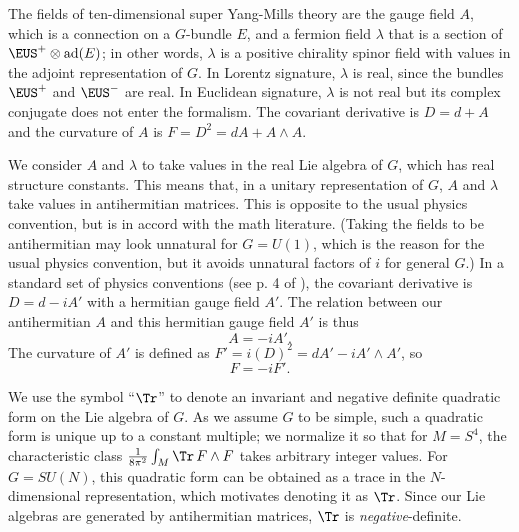 \par{}

The fields of ten-dimensional super Yang-Mills theory are the
gauge field $A$, which is a connection on a $G$-bundle $E$, and a
fermion field $\lambda$ that is a section of ${\EUS}^+\otimes {\rm
ad}(E)$; in other words, $\lambda$ is a positive chirality spinor
field with values in the adjoint representation of $G$. In Lorentz
signature, $\lambda$ is real, since the bundles ${\EUS}^+$ and
${\EUS}^-$ are real.  In Euclidean signature, $\lambda$ is not
real but its complex conjugate does not enter the formalism. The
covariant derivative is $D=d+A$ and the curvature of $A$ is
$F=D^2=dA+A\wedge A$.

We consider $A$ and $\lambda$ to take values in the real Lie
algebra of $G$, which has real structure constants.  This means
that, in a unitary representation of $G$, $A$ and $\lambda$ take
values in antihermitian matrices. This is opposite to the usual
physics convention, but is in accord with the math literature.
(Taking the fields to be antihermitian may look unnatural for
$G=U(1)$, which is the reason for the usual physics convention,
but it avoids unnatural factors of $i$ for general $G$.)  In a
standard set of physics conventions (see p. 4 of \cite{ref44}), the covariant derivative is $D=d-iA'$ with a
hermitian gauge field $A'$.  The relation between our
antihermitian $A$ and this hermitian gauge field $A'$ is thus
\setcounter{equation}{1}
\begin{equation}\label{eq:boloko}
A=-iA'.
\end{equation}
  The curvature of $A'$ is defined as
$F'=i(D)^2=dA'-i A'\wedge A'$, so %
\setcounter{equation}{2}
\begin{equation}\label{eq:obolko}
F=-iF'.
\end{equation}

We use the symbol ``$\Tr$'' to denote an invariant and negative
definite quadratic form on the Lie algebra of $G$.  As we assume
$G$ to be simple, such a quadratic form is unique up to a constant
multiple; we  normalize it so that for $M=S^4$, the characteristic
class ${1\over 8\pi^2}\int_M\Tr\, F\wedge F$ takes arbitrary
integer values. For $G=SU(N)$, this quadratic form can be obtained
as a trace in the $N$-dimensional representation, which motivates
denoting it as $\Tr$. Since our Lie algebras are generated by
antihermitian matrices, $\Tr$ is {\it negative}-definite.

